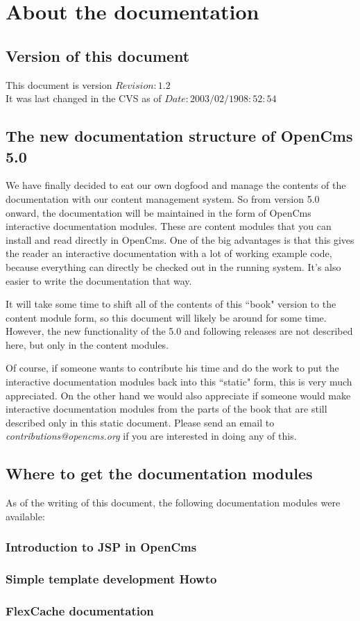 \chapter{About the documentation}

\section{Version of this document}

This document is version $Revision: 1.2 $ \\
It was last changed in the CVS as of $Date: 2003/02/19 08:52:54 $ \\

\section{The new documentation structure of OpenCms 5.0}

We have finally decided to eat our own dogfood and manage the contents of the documentation 
with our content management system.
So from version 5.0 onward, the documentation will be maintained in the form of OpenCms 
interactive documentation modules.
These are content modules that you can install and read directly in OpenCms.
One of the big advantages is that this gives the reader an interactive documentation 
with a lot of working example code,
because everything can directly be checked out in the running system.
It's also easier to write the documentation that way.

It will take some time to shift all of the contents of this ``book" version to 
the content module form, so this document will likely be around for some time.
However, the new functionality of the 5.0 and following releases are not described here,
but only in the content modules.

Of course, if someone wants to contribute his time and do the work to 
put the interactive documentation modules back into this ``static" form, this is very much appreciated. 
On the other hand we would also appreciate if someone would make interactive documentation modules
from the parts of the book that are still described only in this static document.
Please send an email to {\em contributions@opencms.org} if you are interested in doing any of this.

\section{Where to get the documentation modules}

As of the writing of this document, the following documentation modules were available:

\subsection{Introduction to JSP in OpenCms}

\subsection{Simple template development Howto}

\subsection{FlexCache documentation}


